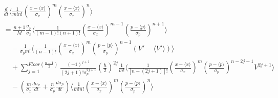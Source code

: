 \documentclass[12pt,a4paper,openany,twoside]{book}
\numberwithin{equation}{section}
\newcommand{\mean}[1]{\langle #1 \rangle}
\begin{document}
\vspace{-0.5cm}
\begin{align*}
  &\frac{d}{dt}\mean{\frac{1}{m!n!}\left(\frac{x-\mean{x}}{\sigma_x}\right)^m\left(\frac{x-\mean{x}}{\sigma_x}\right)^n}\\
  &= \frac{n+1}{M}\frac{\sigma_p}{\sigma_x}\mean{\frac{1}{(m-1)!(n+1)!}\left(\frac{x-\mean{x}}{\sigma_x}\right)^{m-1}\left(\frac{p-\mean{p}}{\sigma_p}\right)^{n+1}}\\
  &\quad -\frac{1}{\sigma_p m!}\mean{\frac{1}{(n-1)!}\left(\frac{x-\mean{x}}{\sigma_x}\right)^{m}\left(\frac{p-\mean{p}}{\sigma_p}\right)^{n-1}(V'-\mean{V'})}\\
  &\quad + \sum_{j=1}^{Floor(\frac{n-1}{2})}\frac{(-1)^{j+1}}{(2j+1)!\sigma_p^{2j+1}}\left(\frac{\hbar}{2}\right)^{2j}\frac{1}{m!}\mean{\frac{1}{[n-(2j+1)]!}\left(\frac{x-\mean{x}}{\sigma_x}\right)^{m}\left(\frac{p-\mean{p}}{\sigma_p}\right)^{n-2j-1}V^{2j+1}}\\
  &\quad - \left(\frac{m}{\sigma_x}\frac{d\sigma_x}{dt}+\frac{n}{\sigma_p}\frac{d\sigma_p}{dt}\right)\mean{\frac{1}{m!n!}\left(\frac{x-\mean{x}}{\sigma_x}\right)^{m}\left(\frac{p-\mean{p}}{\sigma_p}\right)^{n}}
  \end{align*}
\end{document}
